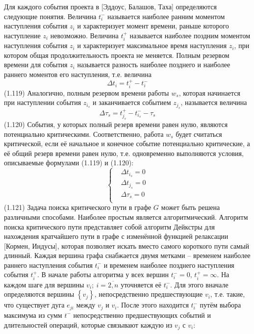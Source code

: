 Для каждого события проекта в [Эддоус, Балашов, Таха] определяются следующие понятия. Величина $t_{i}^{-}$ называется наиболее ранним моментом наступления события ${{z}_{i}}$ и характеризует момент времени, раньше которого наступление ${{z}_{i}}$ невозможно. Величина $t_{i}^{+}$ называется наиболее поздним моментом наступления события ${{z}_{i}}$ и характеризует максимальное время наступления ${{z}_{i}}$, при котором общая продолжительность проекта не меняется. Полным резервом времени для события ${{z}_{i}}$ называется разность наиболее позднего и наиболее раннего моментов его наступления, т.е. величина
	\[\Delta t_i=t^+_i-t^-_i\] 	(1.119)
Аналогично, полным резервом времени работы ${{w}_{s}}$, которая начинается при наступлении события ${{z}_{{{i}_{s}}}}$ и заканчивается событием ${{z}_{{{j}_{s}}}}$, называется величина
	\[\Delta {{\tau }_{s}}=t_{{{j}_{s}}}^{+}-t_{{{i}_{s}}}^{-}-{{\tau }_{s}}\] 	(1.120)
События, у которых полный резерв времени равен нулю, являются потенциально критическими. Соответственно, работа ${{w}_{s}}$ будет считаться критической, если её начальное и конечное событие потенциально критические, а её общий резерв времени равен нулю, т.е. одновременно выполняются условия, описываемые формулами (1.119) и (1.120):
	\[\left\{ \begin{aligned}
  & \Delta {{t}_{{{i}_{s}}}}=0 \\ 
 & \Delta {{t}_{{{j}_{s}}}}=0 \\ 
 & \Delta {{\tau }_{s}}=0 \\ 
\end{aligned} \right.\] 	(1.121)
Задача поиска критического пути в графе $G$ может быть решена различными способами. Наиболее простым является алгоритмический. Алгоритм поиска критического пути представляет собой алгоритм Дейкстры для нахождения кратчайшего пути в графе с изменённой функцией релаксации [Кормен, Индусы], которая позволяет искать вместо самого короткого пути самый длинный. Каждая вершина графа снабжается двумя метками – временем наиболее раннего наступления события $t_{i}^{-}$ и временем наиболее позднего наступления события $t_{i}^{+}$. В начале работы алгоритма у всех вершин $t_{i}^{-}=0$, $t_{i}^{+}=\infty $. На каждом шаге для вершины ${{v}_{i}};\ i=\overline{2,n}$ уточняется её $t_{i}^{-}$. Для этого вначале определяются вершины $\left\{ {{v}_{j}} \right\}$, непосредственно предшествующие ${{v}_{i}}$, т.е. такие, что существует дуга ${{e}_{ji}}$ между ${{v}_{j}}$ и ${{v}_{i}}$. После этого находится $t_{i}^{-}$ путём выбора максимума из сумм ${{t}^{-}}$ непосредственно предшествующих событий и длительностей операций, которые связывают каждую из ${{v}_{j}}$ с ${{v}_{i}}$:
